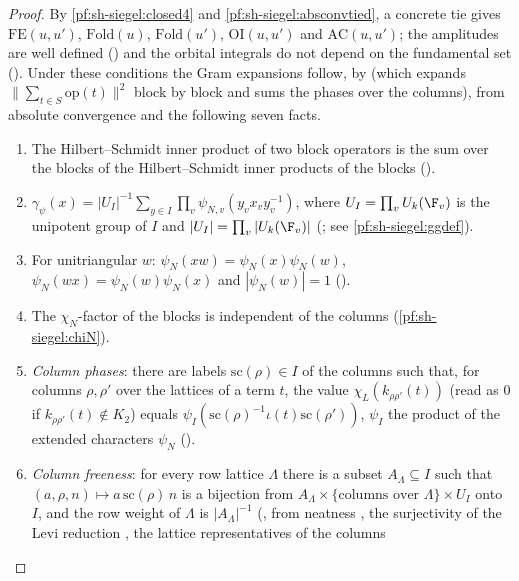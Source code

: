 \begin{proof}
By \cref{pf:sh-siegel:closed4} and \cref{pf:sh-siegel:absconvtied}, a concrete tie gives $\mathrm{FE}(u,u')$, $\mathrm{Fold}(u)$,
$\mathrm{Fold}(u')$, $\mathrm{OI}(u,u')$ and $\mathrm{AC}(u,u')$; the amplitudes are well defined
() and the orbital integrals do not depend on the fundamental set
(). Under these conditions the Gram expansions follow, by
 (which expands $\|\sum_{t\in S}\mathrm{op}(t)\|^2$ block by block and sums the
phases over the columns), from absolute convergence and the following seven facts.
\begin{enumerate}[label=(\roman*)]
\item The Hilbert--Schmidt inner product of two block operators is the sum over the blocks of the Hilbert--Schmidt inner
products of the blocks ().
\item $\gamma_\psi(x)=|U_I|^{-1}\sum_{y\in I}\prod_v\psi_{N,v}(y_vx_vy_v^{-1})$, where $U_I=\prod_vU_k(\F_v)$ is the unipotent
group of $I$ and $|U_I|=\prod_v|U_k(\F_v)|$ (; see
\cref{pf:sh-siegel:ggdef}).
\item For unitriangular $w$: $\psi_N(xw)=\psi_N(x)\psi_N(w)$, $\psi_N(wx)=\psi_N(w)\psi_N(x)$ and $|\psi_N(w)|=1$
().
\item The $\chi_N$-factor of the blocks is independent of the columns (\cref{pf:sh-siegel:chiN}).
\item \emph{Column phases}: there are labels $\mathrm{sc}(\rho)\in I$ of the columns such that, for columns $\rho,\rho'$ over the
lattices of a term $t$, the value $\chi_L(k_{\rho\rho'}(t))$ (read as $0$ if $k_{\rho\rho'}(t)\notin K_2$) equals
$\psi_I(\mathrm{sc}(\rho)^{-1}\iota(t)\mathrm{sc}(\rho'))$, $\psi_I$ the product of the extended characters $\psi_N$
().
\item \emph{Column freeness}: for every row lattice $\Lambda$ there is a subset $A_\Lambda\subseteq I$ such that $(a,\rho,n)\mapsto
a\,\mathrm{sc}(\rho)\,n$ is a bijection from $A_\Lambda\times\{\text{columns over }\Lambda\}\times U_I$ onto $I$, and the row
weight of $\Lambda$ is $|A_\Lambda|^{-1}$ (, from neatness
, the surjectivity of the Levi reduction
, the lattice representatives of the columns

\end{enumerate}
\end{proof}
